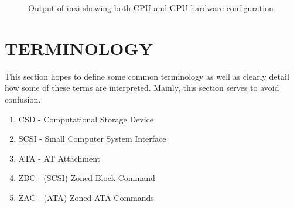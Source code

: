 \documentclass[conference]{IEEEtran}
\newcommand\bashstyle{
	\lstset{
		language=Bash,
		basicstyle=\ttm,
		showstringspaces=false,
		tabsize=2,
		aboveskip=0.2cm,
		belowskip=0.2cm,
		prebreak=\textbackslash,
		extendedchars=true,
		mathescape=false,
		linewidth=8.85cm,
		breaklines=true
	}
}
\newcommand\bashexternal[2][]{{\bashstyle}}
\newcommand\cstyle{
	\lstset{
		language=c,
		basicstyle=\ttm,
		showstringspaces=false,
		tabsize=4,
		aboveskip=0.2cm,
		belowskip=0.2cm,
		otherkeywords={self},             %
		keywordstyle=\ttb\color{deepblue},
		emph={MyClass,__init__},          %
		emphstyle=\ttb\color{deepred},    %
		stringstyle=\color{deepgreen},
		frame=tb,                          %
		prebreak=\textbackslash,
		linewidth=8.85cm,
		breaklines=true,
	}
}
\newcommand\cexternal[2][]{{\cstyle}}
\begin{document}
\begin{center}
	\begin{figure}[H]
		\bashexternal{resources/bash/inxi.sh}
		\captionsetup{justification=centering}
		\caption{Output of inxi showing both CPU and GPU hardware configuration}
		\label{fig:inxihardware}
	\end{figure}
\end{center}



\section*{TERMINOLOGY} \label{term}

This section hopes to define some common terminology as well as clearly detail
how some of these terms are interpreted. Mainly, this section serves to avoid
confusion.

\begin{enumerate}
	\item CSD  - Computational Storage Device
	\item SCSI - Small Computer System Interface
	\item ATA  - AT Attachment
	\item ZBC  - (SCSI) Zoned Block Command
	\item ZAC  - (ATA) Zoned ATA Commands
\end{enumerate}

%
%


\end{document}

